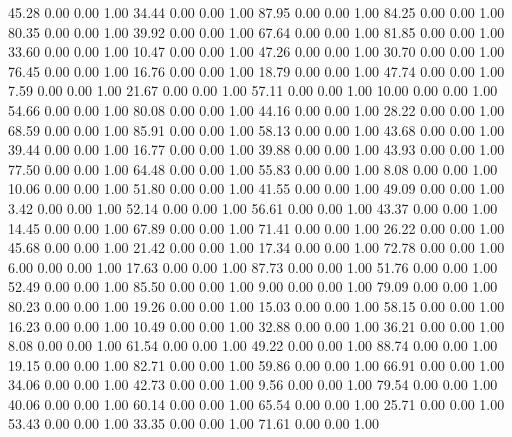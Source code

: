    45.28   0.00   0.00   1.00
   34.44   0.00   0.00   1.00
   87.95   0.00   0.00   1.00
   84.25   0.00   0.00   1.00
   80.35   0.00   0.00   1.00
   39.92   0.00   0.00   1.00
   67.64   0.00   0.00   1.00
   81.85   0.00   0.00   1.00
   33.60   0.00   0.00   1.00
   10.47   0.00   0.00   1.00
   47.26   0.00   0.00   1.00
   30.70   0.00   0.00   1.00
   76.45   0.00   0.00   1.00
   16.76   0.00   0.00   1.00
   18.79   0.00   0.00   1.00
   47.74   0.00   0.00   1.00
    7.59   0.00   0.00   1.00
   21.67   0.00   0.00   1.00
   57.11   0.00   0.00   1.00
   10.00   0.00   0.00   1.00
   54.66   0.00   0.00   1.00
   80.08   0.00   0.00   1.00
   44.16   0.00   0.00   1.00
   28.22   0.00   0.00   1.00
   68.59   0.00   0.00   1.00
   85.91   0.00   0.00   1.00
   58.13   0.00   0.00   1.00
   43.68   0.00   0.00   1.00
   39.44   0.00   0.00   1.00
   16.77   0.00   0.00   1.00
   39.88   0.00   0.00   1.00
   43.93   0.00   0.00   1.00
   77.50   0.00   0.00   1.00
   64.48   0.00   0.00   1.00
   55.83   0.00   0.00   1.00
    8.08   0.00   0.00   1.00
   10.06   0.00   0.00   1.00
   51.80   0.00   0.00   1.00
   41.55   0.00   0.00   1.00
   49.09   0.00   0.00   1.00
    3.42   0.00   0.00   1.00
   52.14   0.00   0.00   1.00
   56.61   0.00   0.00   1.00
   43.37   0.00   0.00   1.00
   14.45   0.00   0.00   1.00
   67.89   0.00   0.00   1.00
   71.41   0.00   0.00   1.00
   26.22   0.00   0.00   1.00
   45.68   0.00   0.00   1.00
   21.42   0.00   0.00   1.00
   17.34   0.00   0.00   1.00
   72.78   0.00   0.00   1.00
    6.00   0.00   0.00   1.00
   17.63   0.00   0.00   1.00
   87.73   0.00   0.00   1.00
   51.76   0.00   0.00   1.00
   52.49   0.00   0.00   1.00
   85.50   0.00   0.00   1.00
    9.00   0.00   0.00   1.00
   79.09   0.00   0.00   1.00
   80.23   0.00   0.00   1.00
   19.26   0.00   0.00   1.00
   15.03   0.00   0.00   1.00
   58.15   0.00   0.00   1.00
   16.23   0.00   0.00   1.00
   10.49   0.00   0.00   1.00
   32.88   0.00   0.00   1.00
   36.21   0.00   0.00   1.00
    8.08   0.00   0.00   1.00
   61.54   0.00   0.00   1.00
   49.22   0.00   0.00   1.00
   88.74   0.00   0.00   1.00
   19.15   0.00   0.00   1.00
   82.71   0.00   0.00   1.00
   59.86   0.00   0.00   1.00
   66.91   0.00   0.00   1.00
   34.06   0.00   0.00   1.00
   42.73   0.00   0.00   1.00
    9.56   0.00   0.00   1.00
   79.54   0.00   0.00   1.00
   40.06   0.00   0.00   1.00
   60.14   0.00   0.00   1.00
   65.54   0.00   0.00   1.00
   25.71   0.00   0.00   1.00
   53.43   0.00   0.00   1.00
   33.35   0.00   0.00   1.00
   71.61   0.00   0.00   1.00
